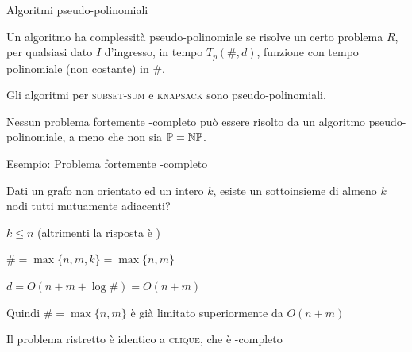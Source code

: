 \begin{frame}{Algoritmi pseudo-polinomiali}

\vspace{-9pt}
\begin{myboxtitle}[Definizione]
Un algoritmo ha complessità \alert{pseudo-polinomiale} se risolve un certo problema $R$, per qualsiasi
dato $I$ d'ingresso, in tempo $T_p(\#, d)$, funzione con tempo polinomiale (non costante) in $\#$.
\end{myboxtitle}

\begin{myboxtitle}[Esempio]
Gli algoritmi per \textsc{subset-sum} e \textsc{knapsack} sono pseudo-polinomiali.
\end{myboxtitle}

\begin{myboxtitle}[Teorema]
Nessun problema fortemente \NP-completo può essere risolto da un algoritmo
pseudo-polinomiale, a meno che non sia $\mathbb{P} = \mbox{$\mathbb{NP}$}$.
\end{myboxtitle}

\end{frame}



\begin{frame}{Esempio: Problema fortemente \NP-completo}

\vspace{-9pt}
\begin{myboxtitle}
Dati un grafo non orientato ed un intero $k$, esiste un sottoinsieme di almeno
$k$ nodi tutti mutuamente adiacenti?
\end{myboxtitle}

\begin{myboxtitle}
\BIL
\item $k \leq n$ (altrimenti la risposta è \FALSE)
\item $\# = \max \{ n, m, k \} = \max \{ n, m \}$
\item $d = O(n + m + \log \#) = O(n+m)$
\item Quindi $\# = \max \{ n, m \}$ è \alert{già} limitato superiormente da $O(n+m)$
\item Il problema ristretto è identico a \textsc{clique}, che è \NP-completo
\EIL
\end{myboxtitle}

\end{frame}


